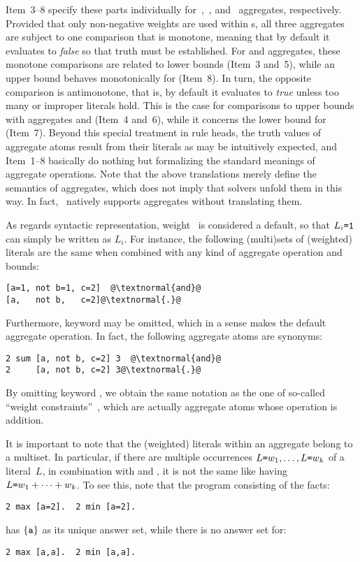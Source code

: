 Item~3--8 specify these parts individually for~,~, and~
aggregates, respectively.
Provided that only non-negative weights are used within s,
all three aggregates are subject to one comparison that is monotone,
meaning that by default it evaluates to \textit{false} so that truth must be established.
For  and  aggregates, these monotone comparisons are related
to lower bounds (Item~3 and~5),
while an upper bound behaves monotonically for  (Item~8).
In turn, the opposite comparison is antimonotone, that is,
by default it evaluates to \textit{true} unless too many or improper literals hold.
This is the case for comparisons to upper bounds with aggregates
 and  (Item~4 and~6), while it concerns 
the lower bound for  (Item~7).
Beyond this special treatment in rule heads,
the truth values of aggregate atoms result from their literals as
may be intuitively expected,
and Item~1--8 basically do nothing but formalizing the standard meanings
of aggregate operations.
Note that the above translations merely define the semantics of aggregates,
which does not imply that solvers unfold them in this way.
In fact, \clasp\ natively supports aggregates without translating them.

As regards syntactic representation,
weight~ is considered a default,
so that $L_i\texttt{=}\texttt{1}$ can simply be written as $L_i$.
For instance, the following (multi)sets of (weighted) literals are the same
when combined with any kind of aggregate operation and bounds:
\begin{lstlisting}[numbers=none,escapechar=@]
[a=1, not b=1, c=2]  @\textnormal{and}@
[a,   not b,   c=2]@\textnormal{.}@
\end{lstlisting}
%
Furthermore,
keyword  may be omitted, which in a sense makes  the default
aggregate operation.
In fact, the following aggregate atoms are synonyms:
\begin{lstlisting}[numbers=none,escapechar=@]
2 sum [a, not b, c=2] 3  @\textnormal{and}@
2     [a, not b, c=2] 3@\textnormal{.}@
\end{lstlisting}
By omitting keyword , we obtain the same notation as the one of 
so-called ``weight constraints''~\cite{siniso02a,lparseManual}, which are actually aggregate atoms
whose operation is addition.

It is important to note that the (weighted) literals within an aggregate
belong to a multiset.
In particular, if there are multiple occurrences
$L\texttt{=}w_1,\dots,L\texttt{=}w_k$
of a literal~$L$, in combination with  and ,
it is not the same like having $L\texttt{=}w_1+\dots+w_k$.
To see this, note that the program consisting of the facts:
\begin{lstlisting}[numbers=none]
2 max [a=2].  2 min [a=2].
\end{lstlisting}
has $\{\texttt{a}\}$ as its unique answer set, while there is no answer set for:
\begin{lstlisting}[numbers=none]
2 max [a,a].  2 min [a,a].
\end{lstlisting}

